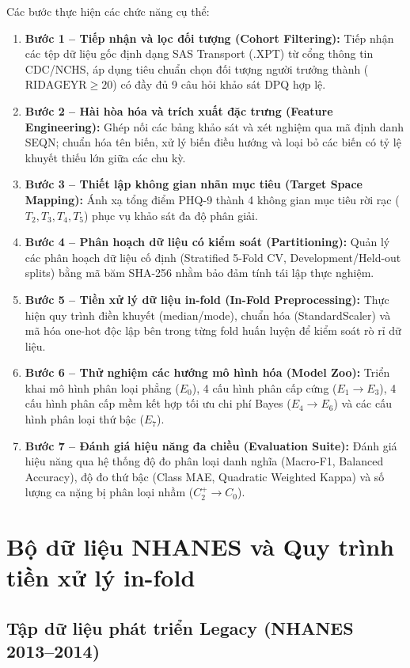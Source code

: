 Các bước thực hiện các chức năng cụ thể:
\begin{enumerate}
    \item \textbf{Bước 1 -- Tiếp nhận và lọc đối tượng (Cohort Filtering):} Tiếp nhận các tệp dữ liệu gốc định dạng SAS Transport (.XPT) từ cổng thông tin CDC/NCHS, áp dụng tiêu chuẩn chọn đối tượng người trưởng thành ($\text{RIDAGEYR} \ge 20$) có đầy đủ 9 câu hỏi khảo sát DPQ hợp lệ.
    \item \textbf{Bước 2 -- Hài hòa hóa và trích xuất đặc trưng (Feature Engineering):} Ghép nối các bảng khảo sát và xét nghiệm qua mã định danh SEQN; chuẩn hóa tên biến, xử lý biến điều hướng và loại bỏ các biến có tỷ lệ khuyết thiếu lớn giữa các chu kỳ.
    \item \textbf{Bước 3 -- Thiết lập không gian nhãn mục tiêu (Target Space Mapping):} Ánh xạ tổng điểm PHQ-9 thành 4 không gian mục tiêu rời rạc ($T_2, T_3, T_4, T_5$) phục vụ khảo sát đa độ phân giải.
    \item \textbf{Bước 4 -- Phân hoạch dữ liệu có kiểm soát (Partitioning):} Quản lý các phân hoạch dữ liệu cố định (Stratified 5-Fold CV, Development/Held-out splits) bằng mã băm SHA-256 nhằm bảo đảm tính tái lập thực nghiệm.
    \item \textbf{Bước 5 -- Tiền xử lý dữ liệu in-fold (In-Fold Preprocessing):} Thực hiện quy trình điền khuyết (median/mode), chuẩn hóa (StandardScaler) và mã hóa one-hot độc lập bên trong từng fold huấn luyện để kiểm soát rò rỉ dữ liệu.
    \item \textbf{Bước 6 -- Thử nghiệm các hướng mô hình hóa (Model Zoo):} Triển khai mô hình phân loại phẳng ($E_0$), 4 cấu hình phân cấp cứng ($E_1 \to E_3$), 4 cấu hình phân cấp mềm kết hợp tối ưu chi phí Bayes ($E_4 \to E_6$) và các cấu hình phân loại thứ bậc ($E_7$).
    \item \textbf{Bước 7 -- Đánh giá hiệu năng đa chiều (Evaluation Suite):} Đánh giá hiệu năng qua hệ thống độ đo phân loại danh nghĩa (Macro-F1, Balanced Accuracy), độ đo thứ bậc (Class MAE, Quadratic Weighted Kappa) và số lượng ca nặng bị phân loại nhầm ($C_2^+ \to C_0$).
\end{enumerate}

\section{Bộ dữ liệu NHANES và Quy trình tiền xử lý in-fold}
\label{sec:du-lieu-nghien-cuu}

\subsection{Tập dữ liệu phát triển Legacy (NHANES 2013--2014)}
\label{subsec:legacy-cohort}

